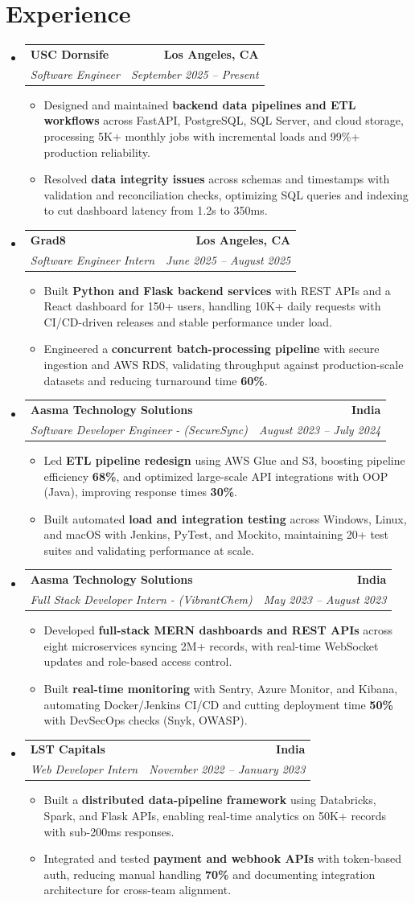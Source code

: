 \documentclass[letterpaper,10pt]{article}
\makeatletter
\newcommand{\resumeItem}[1]{\item\small{{#1 \vspace{-2pt}}}}
\newcommand{\resumeSubheading}[4]{\vspace{-1pt}\item\begin{tabular*}{1.0\textwidth}[t]{l@{\extracolsep{\fill}}r}\textbf{#1} & \textbf{\small #2} \\\textit{\small#3} & \textit{\small #4} \\\end{tabular*}\vspace{-2pt}}
\newcommand{\resumeSubHeadingListStart}{\begin{itemize}[leftmargin=0.0in, label={}]}
\newcommand{\resumeSubHeadingListEnd}{\end{itemize}}
\newcommand{\resumeItemListStart}{\begin{itemize}[leftmargin=0.15in,label=\textbullet,itemsep=2pt,topsep=0pt,parsep=0pt,partopsep=0pt]}
\newcommand{\resumeItemListEnd}{\end{itemize}\vspace{-4pt}}
\makeatother
\begin{document}
\section{Experience}
\resumeSubHeadingListStart
\resumeSubheading{USC Dornsife}{Los Angeles, CA}{Software Engineer}{September 2025 -- Present}
\resumeItemListStart
\resumeItem{Designed and maintained \textbf{backend data pipelines and ETL workflows} across FastAPI, PostgreSQL, SQL Server, and cloud storage, processing 5K+ monthly jobs with incremental loads and 99\%+ production reliability.}
\resumeItem{Resolved \textbf{data integrity issues} across schemas and timestamps with validation and reconciliation checks, optimizing SQL queries and indexing to cut dashboard latency from 1.2s to 350ms.}
\resumeItemListEnd
\resumeSubheading{Grad8}{Los Angeles, CA}{Software Engineer Intern}{June 2025 -- August 2025}
\resumeItemListStart
\resumeItem{Built \textbf{Python and Flask backend services} with REST APIs and a React dashboard for 150+ users, handling 10K+ daily requests with CI/CD-driven releases and stable performance under load.}
\resumeItem{Engineered a \textbf{concurrent batch-processing pipeline} with secure ingestion and AWS RDS, validating throughput against production-scale datasets and reducing turnaround time \textbf{60\%}.}
\resumeItemListEnd
\resumeSubheading{Aasma Technology Solutions}{India}{Software Developer Engineer - (SecureSync)}{August 2023 -- July 2024}
\resumeItemListStart
\resumeItem{Led \textbf{ETL pipeline redesign} using AWS Glue and S3, boosting pipeline efficiency \textbf{68\%}, and optimized large-scale API integrations with OOP (Java), improving response times \textbf{30\%}.}
\resumeItem{Built automated \textbf{load and integration testing} across Windows, Linux, and macOS with Jenkins, PyTest, and Mockito, maintaining 20+ test suites and validating performance at scale.}
\resumeItemListEnd
\resumeSubheading{Aasma Technology Solutions}{India}{Full Stack Developer Intern - (VibrantChem)}{May 2023 -- August 2023}
\resumeItemListStart
\resumeItem{Developed \textbf{full-stack MERN dashboards and REST APIs} across eight microservices syncing 2M+ records, with real-time WebSocket updates and role-based access control.}
\resumeItem{Built \textbf{real-time monitoring} with Sentry, Azure Monitor, and Kibana, automating Docker/Jenkins CI/CD and cutting deployment time \textbf{50\%} with DevSecOps checks (Snyk, OWASP).}
\resumeItemListEnd
\resumeSubheading{LST Capitals}{India}{Web Developer Intern}{November 2022 -- January 2023}
\resumeItemListStart
\resumeItem{Built a \textbf{distributed data-pipeline framework} using Databricks, Spark, and Flask APIs, enabling real-time analytics on 50K+ records with sub-200ms responses.}
\resumeItem{Integrated and tested \textbf{payment and webhook APIs} with token-based auth, reducing manual handling \textbf{70\%} and documenting integration architecture for cross-team alignment.}
\resumeItemListEnd
\resumeSubHeadingListEnd
\vspace{-6pt}
\end{document}
